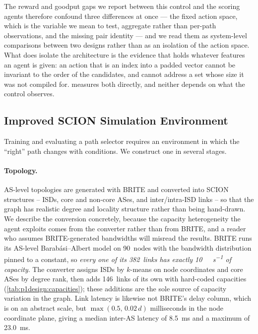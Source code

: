 The reward and goodput gaps we report between this control and the scoring agents therefore confound
three differences at once --- the fixed action space, which is the variable we mean to test, aggregate
rather than per-path observations, and the missing pair identity --- and we read them as system-level
comparisons between two designs rather than as an isolation of the action space. What does isolate the
architecture is the evidence that holds whatever features an agent is given: an action that is an index
into a padded vector cannot be invariant to the order of the candidates, and cannot address a set whose
size it was not compiled for.  measures both directly, and neither depends on
what the control observes.

\subsection{Improved SCION Simulation Environment}
\label{sec:p1design:env}

Training and evaluating a path selector requires an environment in which the ``right'' path changes
with conditions. We construct one in several stages.

\paragraph{Topology.} AS-level topologies are generated with BRITE and converted into SCION structures
-- ISDs, core and non-core ASes, and inter/intra-ISD links -- so that the graph has realistic degree
and locality structure rather than being hand-drawn. We describe the conversion concretely, because the
capacity heterogeneity the agent exploits comes from the converter rather than from BRITE, and a reader
who assumes BRITE-generated bandwidths will misread the results. BRITE runs its AS-level
Barab\'{a}si--Albert model on 90~nodes with the bandwidth distribution pinned to a constant, so
\emph{every one of its 382~links has exactly \SI{10}{\giga\bit\per\second} of capacity}. The converter
assigns ISDs by $k$-means on node coordinates and core ASes by degree rank, then adds 146~links of its
own with hard-coded capacities (\cref{tab:p1design:capacities}); these additions are the sole source of
capacity variation in the graph. Link latency is likewise not BRITE's delay column, which is on an
abstract scale, but $\max(0.5,\,0.02\,d)$ milliseconds in the node coordinate plane, giving a median
inter-AS latency of \SI{8.5}{\milli\second} and a maximum of \SI{23.0}{\milli\second}.

